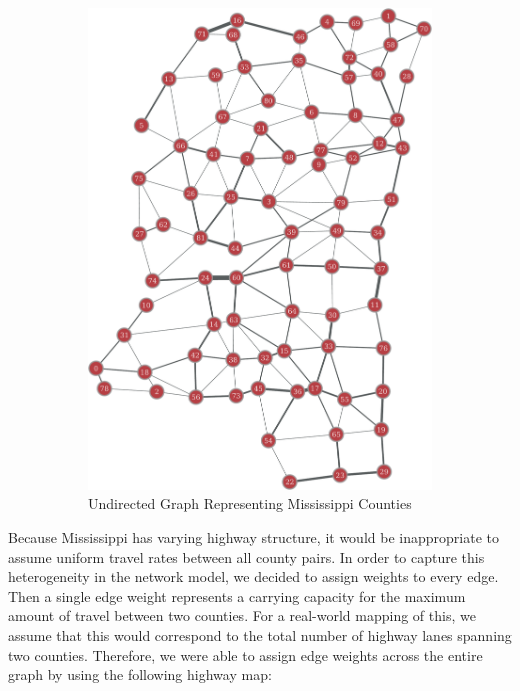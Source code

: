 \documentclass[titlepage]{article}
\begin{document}
\begin{figure}[H]
\begin{subfigure}[b]{0.5\textwidth}
      \includegraphics[width=\linewidth]{figures/full_undirected-crop.pdf}
      \caption*{Undirected Graph Representing Mississippi Counties}
    \end{subfigure}
    \caption*{}
  \end{figure}
  \par
     Because Mississippi has varying highway structure, it would be inappropriate to assume uniform travel rates between all county pairs. In order to capture this heterogeneity in the network model, we decided to assign weights to every edge. Then a single edge weight represents a carrying capacity for the maximum amount of travel between two counties. For a real-world mapping of this, we assume that this would correspond to the total number of highway lanes spanning two counties. Therefore, we were able to assign edge weights across the entire graph by using the following highway map:
\end{document}
